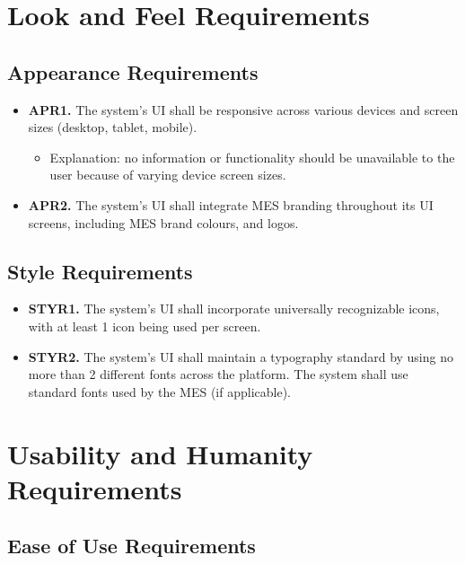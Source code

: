 \documentclass[12pt]{article}
\begin{document}
\section{Look and Feel Requirements}
\subsection{Appearance Requirements}

\label{APR}

\begin{itemize}
    \item \textbf{APR1.} The system's UI shall be responsive across various devices and screen sizes (desktop, tablet, mobile).
    \begin{itemize}
        \item Explanation: no information or functionality should be unavailable to the user because of varying device screen sizes.
    \end{itemize}
    \item \textbf{APR2.} The system's UI shall integrate MES branding throughout its UI screens, including MES brand colours, and logos.
\end{itemize}

\subsection{Style Requirements}

\label{STYR}

\begin{itemize}
    \item \textbf{STYR1.} The system's UI shall incorporate universally recognizable icons, with at least 1 icon being used per screen.
    \item \textbf{STYR2.} The system's UI shall maintain a typography standard by using no more than 2 different fonts across the platform. The system shall use standard fonts used by the MES (if applicable).
\end{itemize}

\section{Usability and Humanity Requirements}
\subsection{Ease of Use Requirements}

\label{EUR}
\end{document}
